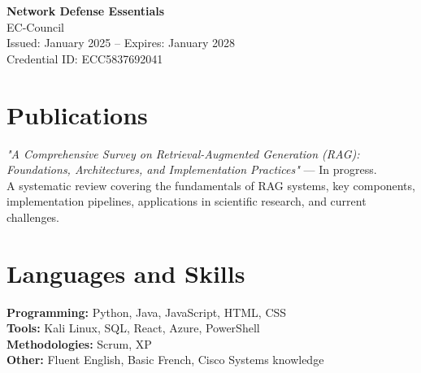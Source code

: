 \documentclass[11pt,a4paper]{article}
\newenvironment{uniformindent}{%
  \begin{list}{}{%
    \setlength{\leftmargin}{2em}
    \setlength{\rightmargin}{0pt}
    \setlength{\topsep}{0pt}
    \setlength{\partopsep}{0pt}
    \setlength{\parsep}{0pt}
    \setlength{\itemsep}{0pt}
  }
  \item[]
}{%
  \end{list}
}
\begin{document}
\begin{uniformindent}
\textbf{Network Defense Essentials}\\
EC-Council \\ Issued: January 2025 -- Expires: January 2028\\
Credential ID: ECC5837692041

\section*{Publications}

\textit{"A Comprehensive Survey on Retrieval-Augmented Generation (RAG): Foundations, Architectures, and Implementation Practices"} — In progress.\\
A systematic review covering the fundamentals of RAG systems, key components, implementation pipelines, applications in scientific research, and current challenges.

\section*{Languages and Skills}

\textbf{Programming:} Python, Java, JavaScript, HTML, CSS\\
\textbf{Tools:} Kali Linux, SQL, React, Azure, PowerShell\\
\textbf{Methodologies:} Scrum, XP\\
\textbf{Other:} Fluent English, Basic French, Cisco Systems knowledge

\end{uniformindent}
\end{document}
